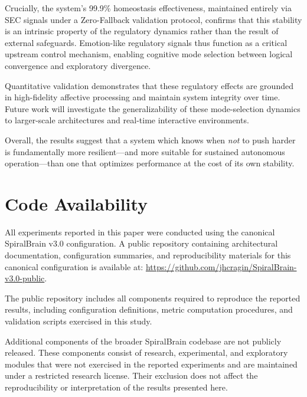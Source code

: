 \documentclass[11pt]{article}
\begin{document}
Crucially, the system’s 99.9\% homeostasis effectiveness, maintained entirely via SEC signals under a Zero-Fallback validation protocol, confirms that this stability is an intrinsic property of the regulatory dynamics rather than the result of external safeguards. Emotion-like regulatory signals thus function as a critical upstream control mechanism, enabling cognitive mode selection between logical convergence and exploratory divergence.

Quantitative validation demonstrates that these regulatory effects are grounded in high-fidelity affective processing and maintain system integrity over time. Future work will investigate the generalizability of these mode-selection dynamics to larger-scale architectures and real-time interactive environments.

\pagebreak

Overall, the results suggest that a system which knows when \emph{not} to push harder is fundamentally more resilient—and more suitable for sustained autonomous operation—than one that optimizes performance at the cost of its own stability.

\section{Code Availability}

All experiments reported in this paper were conducted using the canonical SpiralBrain v3.0 configuration. 
A public repository containing architectural documentation, configuration summaries, and reproducibility materials for this canonical configuration is available at:
\url{https://github.com/jhcragin/SpiralBrain-v3.0-public}.

The public repository includes all components required to reproduce the reported results, including configuration definitions, metric computation procedures, and validation scripts exercised in this study.

Additional components of the broader SpiralBrain codebase are not publicly released. These components consist of research, experimental, and exploratory modules that were not exercised in the reported experiments and are maintained under a restricted research license. Their exclusion does not affect the reproducibility or interpretation of the results presented here.


\end{document}
